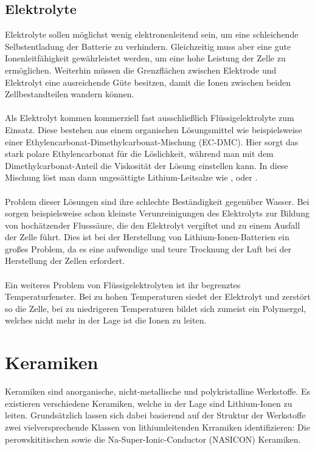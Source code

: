 \documentclass[a4paper, 11pt, headsepline,footsepline,twoside,abstract]{scrbook}
\begin{document}
\subsection{Elektrolyte}
Elektrolyte sollen möglichst wenig elektronenleitend sein, um eine schleichende Selbstentladung der Batterie zu verhindern. Gleichzeitig muss aber eine gute Ionenleitfähigkeit gewährleistet werden, um eine hohe Leistung der Zelle zu ermöglichen. Weiterhin müssen die Grenzflächen zwischen Elektrode und Elektrolyt eine ausreichende Güte besitzen, damit die Ionen zwischen beiden Zellbestandteilen wandern können.
\\\\
Als Elektrolyt kommen kommerziell fast ausschließlich Flüssigelektrolyte zum Einsatz. Diese bestehen aus einem organischen Lösungsmittel wie beispielsweise einer Ethylencarbonat-Dimethylcarbonat-Mischung (EC-DMC). Hier sorgt das stark polare Ethylencarbonat für die Löslichkeit, während man mit dem Dimethylcarbonat-Anteil die Viskosität der Lösung einstellen kann. In diese Mischung löst man dann ungesättigte Lithium-Leitsalze wie ,  oder .
\\\\
Problem dieser Lösungen sind ihre schlechte Beständigkeit gegenüber Wasser. Bei  sorgen beispielsweise schon kleinste Verunreinigungen des Elektrolyts zur Bildung von hochätzender Flusssäure, die den Elektrolyt vergiftet und zu einem Ausfall der Zelle führt. Dies ist bei der Herstellung von Lithium-Ionen-Batterien ein großes Problem, da es eine aufwendige und teure Trocknung der Luft bei der Herstellung der Zellen erfordert.
\\\\
Ein weiteres Problem von Flüssigelektrolyten ist ihr begrenztes Temperaturfenster. Bei zu hohen Temperaturen siedet der Elektrolyt und zerstört so die Zelle, bei zu niedrigeren Temperaturen bildet sich zumeist ein Polymergel, welches nicht mehr in der Lage ist die Ionen zu leiten.
\section{Keramiken}
Keramiken sind anorganische, nicht-metallische und polykristalline Werkstoffe. Es existieren verschiedene Keramiken, welche in der Lage sind Lithium-Ionen zu leiten. Grundsätzlich lassen sich dabei basierend auf der Struktur der Werkstoffe zwei vielversprechende Klassen von lithiumleitenden Krramiken identifizieren: Die perowskititischen sowie die Na-Super-Ionic-Conductor (NASICON) Keramiken. 
\end{document}
